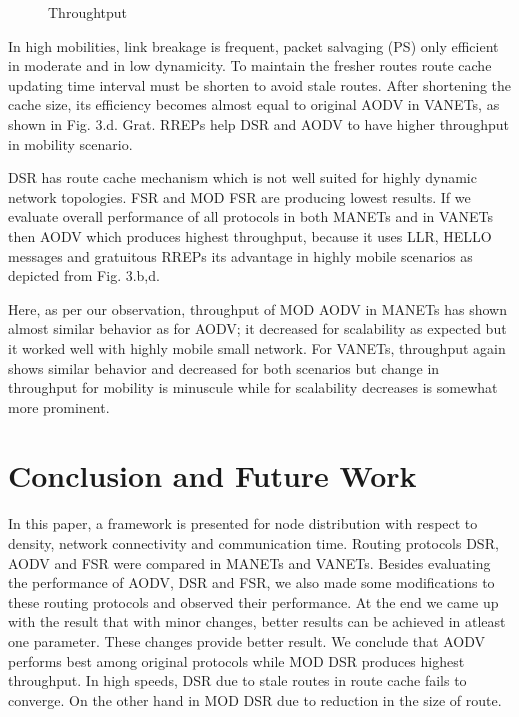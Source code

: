 \documentclass[journal]{IEEEtran}
\begin{document}
\begin{figure*}[t]
  \centering
\caption{Throughtput}
\end{figure*}
\vspace{0.3cm}
\hspace{0.3cm}\small

In high mobilities, link breakage is frequent, packet salvaging (PS) only efficient in moderate and in low dynamicity. To maintain the fresher routes route cache updating time interval must be shorten to avoid stale routes.
 After shortening the cache size, its efficiency becomes almost equal to original AODV in VANETs, as shown in Fig. 3.d. Grat. RREPs help DSR and AODV to have higher throughput in mobility scenario.

DSR has route cache mechanism which is not well suited for highly dynamic network topologies. FSR and MOD FSR are producing lowest results.
If we evaluate overall performance of all protocols in both MANETs and in VANETs then AODV which produces highest throughput, because it uses LLR, HELLO messages and gratuitous RREPs its advantage in highly mobile scenarios as depicted from  Fig. 3.b,d.

Here, as per our observation, throughput of MOD AODV in MANETs has shown almost similar behavior as for AODV; it decreased for scalability as expected but it worked well with highly mobile small network. For VANETs, throughput again shows similar behavior and decreased for both scenarios but change in throughput for mobility is minuscule while for scalability decreases is somewhat more prominent.



\section{Conclusion and Future Work}
In this paper, a framework is presented for node distribution with respect to density, network connectivity and communication time. Routing protocols DSR, AODV and FSR were compared in MANETs and VANETs. Besides evaluating the performance of AODV, DSR and FSR, we also made some modifications to these routing protocols and observed their performance. At the end we came up with the result that with minor changes, better results can be achieved in atleast one parameter. These changes provide better result. We conclude that AODV performs best among original protocols while MOD DSR produces highest throughput. In high speeds, DSR due to stale routes in route cache fails to converge. On the other hand in MOD DSR due to reduction in the size of route.
\end{document}
